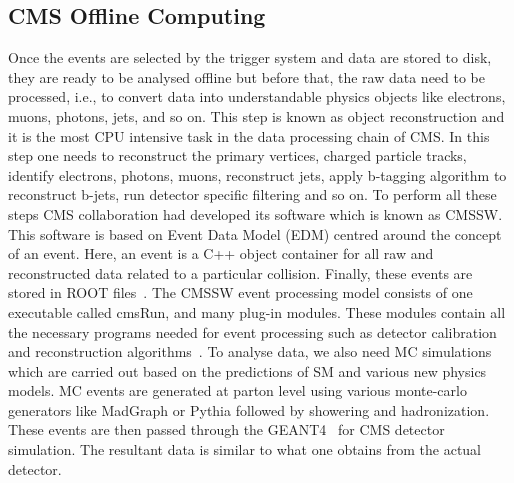 


\subsection{CMS Offline Computing} %
\label{sub:cms_offline_computing}
Once the events are selected by the trigger system and data are stored to disk, they are ready to be analysed offline but before that, the raw data need to be processed, i.e., to convert data into understandable physics objects like electrons, muons, photons, jets, and so on. This step is known as object reconstruction and it is the most CPU intensive task in the data processing chain of CMS. In this step one needs to reconstruct the primary vertices, charged particle tracks, identify electrons, photons, muons, reconstruct jets, apply b-tagging algorithm to reconstruct b-jets, run detector specific filtering and so on.
To perform all these steps CMS collaboration had developed its software which is known as CMSSW. This software is based on Event Data Model (EDM) centred around the concept of an  event. Here, an event is a C++ object container for all raw and reconstructed data related to a particular collision. Finally, these events are stored in ROOT files~\cite{Root1996}. The CMSSW event processing model consists of one executable called cmsRun, and many plug-in modules. These modules contain all the necessary programs needed for event processing such as detector calibration and reconstruction algorithms~\cite{Bayatyan2005}.
To analyse data, we also need MC simulations which are carried out based on the predictions of SM and various new physics models. MC events are generated at parton level using various monte-carlo generators like MadGraph or Pythia followed by showering and hadronization. These events are then passed through the GEANT4~\cite{Agostinelli2003} for CMS detector simulation. The resultant data is similar to what one obtains from the actual detector.
